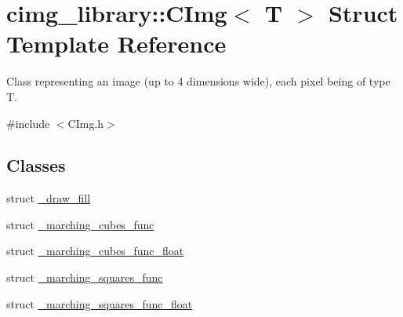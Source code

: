 \hypertarget{structcimg__library_1_1_c_img}{
\section{cimg\_\-library::CImg$<$ T $>$ Struct Template Reference}
\label{structcimg__library_1_1_c_img}
}


Class representing an image (up to 4 dimensions wide), each pixel being of type {\ttfamily T}.  




{\ttfamily \#include $<$CImg.h$>$}

\subsection*{Classes}
\begin{DoxyCompactItemize}
\item 
struct \hyperlink{structcimg__library_1_1_c_img_1_1__draw__fill}{\_\-draw\_\-fill}
\item 
struct \hyperlink{structcimg__library_1_1_c_img_1_1__marching__cubes__func}{\_\-marching\_\-cubes\_\-func}
\item 
struct \hyperlink{structcimg__library_1_1_c_img_1_1__marching__cubes__func__float}{\_\-marching\_\-cubes\_\-func\_\-float}
\item 
struct \hyperlink{structcimg__library_1_1_c_img_1_1__marching__squares__func}{\_\-marching\_\-squares\_\-func}
\item 
struct \hyperlink{structcimg__library_1_1_c_img_1_1__marching__squares__func__float}{\_\-marching\_\-squares\_\-func\_\-float}
\end{DoxyCompactItemize}
